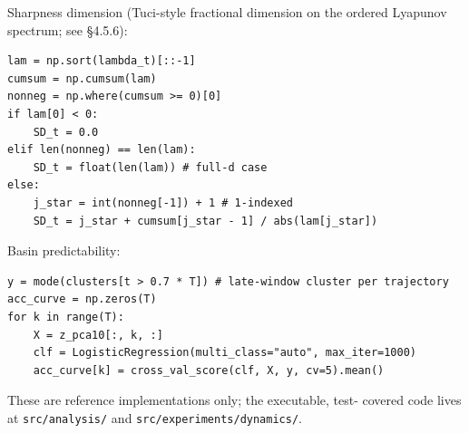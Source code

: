 \documentclass{article}
\newenvironment{codeblock}[1][]{%
  \par\addvspace{2pt}%
  \ifstrempty{#1}{}{\noindent\textit{\small #1}\par\nobreak\addvspace{2pt}}%
  \begingroup\footnotesize\begin{mdframed}[style=codestyle]%
}{%
  \end{mdframed}\endgroup\par%
}
\theoremstyle{plain}
\theoremstyle{definition}
\begin{document}
Sharpness dimension (Tuci-style fractional dimension on the ordered
Lyapunov spectrum; see §4.5.6):

\begin{codeblock}
\begin{verbatim}
lam = np.sort(lambda_t)[::-1]
cumsum = np.cumsum(lam)
nonneg = np.where(cumsum >= 0)[0]
if lam[0] < 0:
    SD_t = 0.0
elif len(nonneg) == len(lam):
    SD_t = float(len(lam)) # full-d case
else:
    j_star = int(nonneg[-1]) + 1 # 1-indexed
    SD_t = j_star + cumsum[j_star - 1] / abs(lam[j_star])
\end{verbatim}
\end{codeblock}

Basin predictability:

\begin{codeblock}
\begin{verbatim}
y = mode(clusters[t > 0.7 * T]) # late-window cluster per trajectory
acc_curve = np.zeros(T)
for k in range(T):
    X = z_pca10[:, k, :]
    clf = LogisticRegression(multi_class="auto", max_iter=1000)
    acc_curve[k] = cross_val_score(clf, X, y, cv=5).mean()
\end{verbatim}
\end{codeblock}

These are reference implementations only; the executable, test-
covered code lives at \texttt{src/analysis/} and \texttt{src/experiments/dynamics/}.
\end{document}
